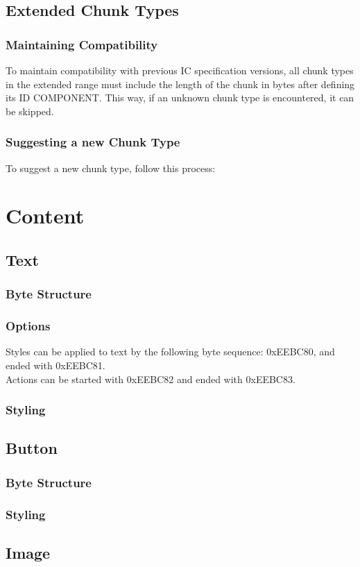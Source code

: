 \documentclass{report}
\begin{document}
\section{Extended Chunk Types}
\subsection{Maintaining Compatibility}
To maintain compatibility with previous IC specification versions, all chunk types in the extended range must include the length of the chunk in bytes after defining its ID COMPONENT. This way, if an unknown chunk type is encountered, it can be skipped.
\subsection{Suggesting a new Chunk Type}
To suggest a new chunk type, follow this process:

\chapter{Content}
\section{Text}
\subsection{Byte Structure}
\subsection{Options}
Styles can be applied to text by the following byte sequence: 0xEEBC80, and ended with 0xEEBC81.\\
Actions can be started with 0xEEBC82 and ended with 0xEEBC83.
\subsection{Styling}
\section{Button}
\subsection{Byte Structure}
\subsection{Styling}
\section{Image}
\end{document}
